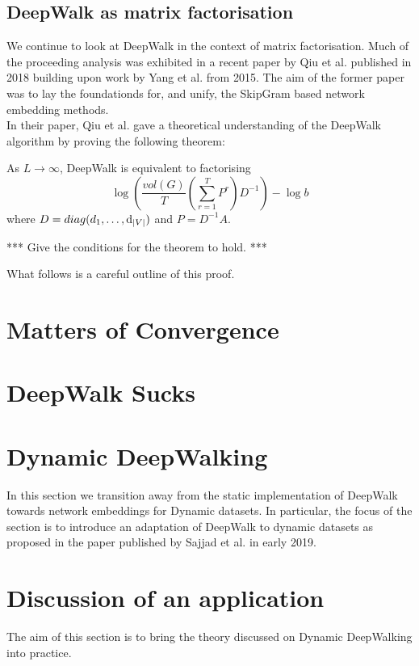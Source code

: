 \documentclass[a4paper]{article}
\begin{document}
\subsection{DeepWalk as matrix factorisation}

We continue to look at DeepWalk in the context of matrix factorisation. Much of the proceeding analysis was exhibited in a recent paper by Qiu et
al.\cite{qiu2018} published in 2018 building upon work by Yang et al.\cite{yang2015}
from 2015. The aim of the former paper was to lay the foundationds for, and
unify, the SkipGram based network embedding methods.\\

In their paper, Qiu et al. gave a theoretical understanding of the DeepWalk
algorithm by proving the following theorem:

\begin{theorem}
  As $L \to \infty$, DeepWalk is equivalent to factorising
  \[\log{\left(\frac{vol(G)}{T}\left( \sum_{r = 1}^T P^r  \right) D^{-1}
    \right)} - \log{b}\]
  where $D = diag(d_1, \dots, \mathrm{d}_{|V|})$ and $P = D^{-1}A$.
\end{theorem}

*** Give the conditions for the theorem to hold. ***

What follows is a careful outline of this proof.

\section{Matters of Convergence}
\section{DeepWalk Sucks}
\section{Dynamic DeepWalking}
In this section we transition away from the static implementation of DeepWalk
towards network embeddings for Dynamic datasets. In particular, the focus of the
section is to introduce an adaptation of DeepWalk to dynamic datasets as
proposed in the paper published by Sajjad et al.\cite{sajjad2019} in early 2019.


\section{Discussion of an application}

The aim of this section is to bring the theory discussed on Dynamic DeepWalking
into practice.






\printindex
\end{document}
